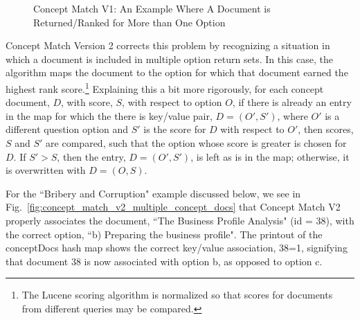 \begin{figure}
\centering
\vspace{1.0in}
\caption{Concept Match V1: An Example Where A Document is Returned/Ranked for More than One Option}
\label{fig:concept_match_v1_wrong_option_doc}
\end{figure}

Concept Match Version 2 corrects this problem by recognizing a situation in which a document is included in multiple option return sets.  In this case, the algorithm maps the document to the option for which that document earned the highest rank score.\footnote{The Lucene scoring algorithm is normalized so that scores for documents from different queries may be compared.}  Explaining this a bit more rigorously, for each concept document, $D$, with score, $S$, with respect to option $O$, if there is already an entry in the map for which the there is key/value pair, $D=(O',S')$, where $O'$ is a different question option and $S'$ is the score for $D$ with respect to $O'$, then scores, $S$ and $S'$ are compared, such that the option whose score is greater is chosen for $D$. If $S' > S$, then the entry, $D = (O',S')$, is left as is in the map; otherwise, it is overwritten with $D = (O,S)$.

For the ``Bribery and Corruption" example discussed below, we see in Fig.~\ref{fig:concept_match_v2_multiple_concept_docs} that Concept Match V2 properly associates the document, ``The Business Profile Analysis" (id = 38), with the correct option, ``b) Preparing the business profile".  The printout of the conceptDocs hash map shows the correct key/value association, 38=1, signifying that document 38 is now associated with option b, as opposed to option c.


